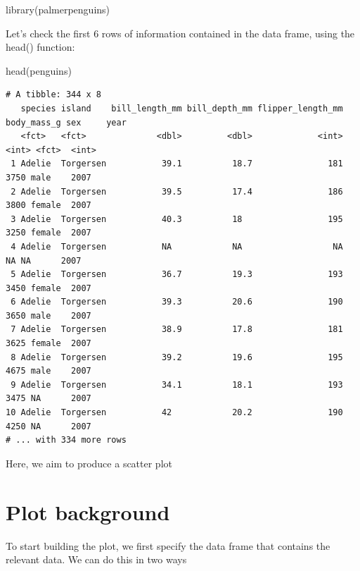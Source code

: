 \documentclass[
]{book}
\newenvironment{Shaded}{\begin{snugshade}}{\end{snugshade}}
\newcommand{\FunctionTok}[1]{\textcolor[rgb]{0.00,0.00,0.00}{#1}}
\newcommand{\NormalTok}[1]{#1}
\begin{document}
\begin{Shaded}
\begin{Highlighting}[]
\FunctionTok{library}\NormalTok{(palmerpenguins)}
\end{Highlighting}
\end{Shaded}

Let's check the first 6 rows of information contained in the data frame, using the head() function:

\begin{Shaded}
\begin{Highlighting}[]
\FunctionTok{head}\NormalTok{(penguins)}
\end{Highlighting}
\end{Shaded}

\begin{verbatim}
# A tibble: 344 x 8
   species island    bill_length_mm bill_depth_mm flipper_length_mm body_mass_g sex     year
   <fct>   <fct>              <dbl>         <dbl>             <int>       <int> <fct>  <int>
 1 Adelie  Torgersen           39.1          18.7               181        3750 male    2007
 2 Adelie  Torgersen           39.5          17.4               186        3800 female  2007
 3 Adelie  Torgersen           40.3          18                 195        3250 female  2007
 4 Adelie  Torgersen           NA            NA                  NA          NA NA      2007
 5 Adelie  Torgersen           36.7          19.3               193        3450 female  2007
 6 Adelie  Torgersen           39.3          20.6               190        3650 male    2007
 7 Adelie  Torgersen           38.9          17.8               181        3625 female  2007
 8 Adelie  Torgersen           39.2          19.6               195        4675 male    2007
 9 Adelie  Torgersen           34.1          18.1               193        3475 NA      2007
10 Adelie  Torgersen           42            20.2               190        4250 NA      2007
# ... with 334 more rows
\end{verbatim}

Here, we aim to produce a scatter plot

\hypertarget{plot-background}{%
\section{Plot background}\label{plot-background}}

To start building the plot, we first specify the data frame that contains the relevant data. We can do this in two ways
\end{document}
